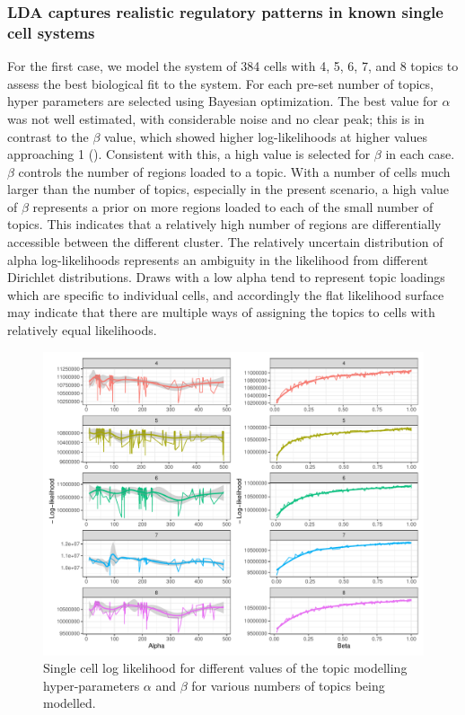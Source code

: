 \subsubsection{LDA captures realistic regulatory patterns in known single cell systems} \label{ch4:sc}

For the first case, we model the system of 384 cells with 4, 5, 6, 7, and 8 topics to assess the best biological fit to the system. For each pre-set number of topics, hyper parameters are selected using Bayesian optimization. The best value for $\alpha$ was not well estimated, with considerable noise and no clear peak; this is in contrast to the $\beta$ value, which showed higher log-likelihoods at higher values approaching 1 (). Consistent with this, a high value is selected for $\beta$ in each case. $\beta$ controls the number of regions loaded to a topic. With a number of cells much larger than the number of topics, especially in the present scenario, a high value of $\beta$ represents a prior on more regions loaded to each of the small number of topics. This indicates that a relatively high number of regions are differentially accessible between the different cluster. The relatively uncertain distribution of alpha log-likelihoods represents an ambiguity in the likelihood from different Dirichlet distributions. Draws with a low alpha tend to represent topic loadings which are specific to individual cells, and accordingly the flat likelihood surface may indicate that there are multiple ways of assigning the topics to cells with relatively equal likelihoods.


\begin{figure}
  \centering
  \includegraphics[width=\textwidth]{plot/ch4/sc_opt_params}
  \caption{Single cell log likelihood for different values of the topic modelling hyper-parameters $\alpha$ and $\beta$ for various numbers of topics being modelled.}
  \label{fig:sc_opt_params}
\end{figure}

